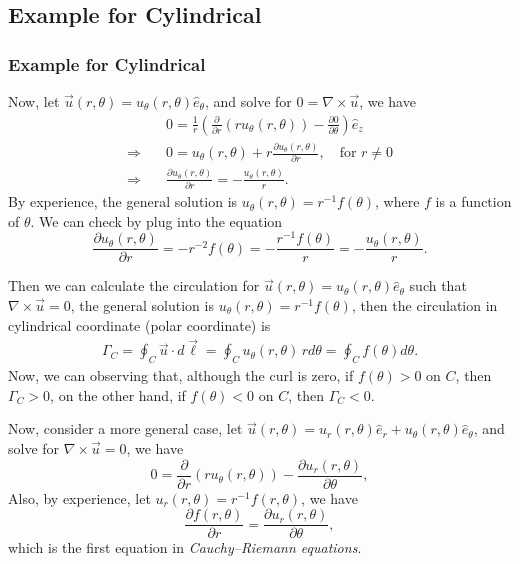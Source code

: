 \documentclass[11pt,]{beamer}
\begin{document}
\subsection{Example for Cylindrical}
\begin{frame}
\frametitle{Example for Cylindrical}
	Now, let $\vec{u}(r,\theta) = u_\theta(r,\theta)\hat{e}_\theta$, 
	and solve for $0=\nabla\times\vec{u}$, we have
	\begin{align}
	& 0 = \frac{1}{r}\left(\frac {\partial}{\partial r}\left(r u_\theta(r,\theta)\right)
		-\frac{\partial 0}{\partial \theta}\right)\hat{e}_z\\
	\Rightarrow\quad 
	& 0 = u_\theta(r,\theta) + r\frac{\partial u_{\theta}(r,\theta)}{\partial r},
	\quad\text{for $r\neq 0$}\\
	\Rightarrow\quad 
	& \frac{\partial u_{\theta}(r,\theta)}{\partial r} = -\frac{u_{\theta}(r,\theta)}{r}.
	\end{align}
	By experience, the general solution is $u_{\theta}(r,\theta) = r^{-1}f(\theta)$, 
	where $f$ is a function of $\theta$. We can check by plug into the equation
	\begin{equation*}
	\frac{\partial u_{\theta}(r,\theta)}{\partial r} 
	= -r^{-2}f(\theta) 
	= -\frac{r^{-1}f(\theta)}{r} 
	= -\frac{u_{\theta}(r,\theta)}{r}.
	\end{equation*}
\end{frame}
\begin{frame}
	Then we can calculate the circulation for 
	$\vec{u}(r,\theta) = u_\theta(r,\theta)\hat{e}_\theta$ such that $\nabla \times \vec{u}= 0$, 
	the general solution is $u_\theta(r,\theta) = r^{-1}f(\theta)$, 
	then the circulation in cylindrical coordinate (polar coordinate) is 
	\begin{align}
	\Gamma_{C} = \oint_{C}\vec{u}\cdot d\vec{\ell} = \oint_{C} u_{\theta}(r,\theta)\,rd\theta
	= \oint_{C} f(\theta) d\theta.
	\end{align}
	Now, we can observing that, although the curl is zero, if $f(\theta)>0$ on $C$, then $\Gamma_{C}>0$, on the other hand, if $f(\theta)<0$ on $C$, then $\Gamma_{C}<0$.
\end{frame}

\begin{frame}
	Now, consider a more general case, 
	let $\vec{u}(r,\theta) = u_r(r,\theta)\hat{e}_r + u_\theta(r,\theta)\hat{e}_\theta$, 
	and solve for $\nabla\times \vec{u} = 0$, we have
	\begin{equation}
	0 = \frac {\partial}{\partial r}\left(r u_\theta(r,\theta)\right)
		-\frac{\partial u_r(r,\theta)}{\partial \theta},
	\end{equation}
	Also, by experience, let $u_{r}(r,\theta) = r^{-1}f(r,\theta)$, we have
	\begin{equation}
	\frac{\partial f(r,\theta)}{\partial r} = \frac{\partial u_r(r,\theta)}{\partial \theta},
	\end{equation}
	which is the first equation in \textit{Cauchy–Riemann equations}.
\end{frame}
\end{document}

